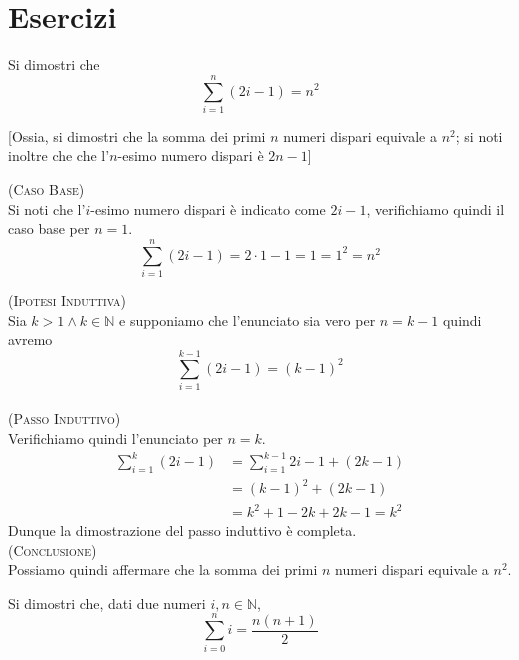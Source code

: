 \section{Esercizi}



\begin{esercizio}
Si dimostri che 
$$\sum\limits_{i=1}^{n} (2 i -1) = n^2$$

[Ossia, si dimostri che la somma dei primi $n$ numeri dispari equivale a $n^2$; si noti inoltre che che l'$n$-esimo numero dispari è $2n-1$]
\end{esercizio}

\begin{soluzione}
    

\textsc{(Caso Base)}\\
Si noti che l'$i$-esimo numero dispari è indicato come $2 i - 1$, verifichiamo quindi il caso base per $n=1$.
$$\sum\limits_{i=1}^{n} (2 i -1) = 2\cdot 1 - 1 = 1 = 1^2 = n^2$$


\textsc{(Ipotesi Induttiva)}\\
Sia $k>1 \wedge k\in\mathbb{N}$ e supponiamo che l'enunciato sia vero per $n=k-1$ quindi avremo 
$$\sum\limits_{i=1}^{k-1} (2 i -1)=(k-1)^2 $$\\

\textsc{(Passo Induttivo)}\\
Verifichiamo quindi l'enunciato per $n=k$. 
\begin{align*}
\sum\limits_{i=1}^{k} (2i -1) &= \sum\limits_{i=1}^{k-1} 2i - 1 +(2k-1)\\
&= (k-1)^2+(2k-1)\\
&= k^2+1-2k+2k-1 = k^2
\end{align*}
Dunque la dimostrazione del passo induttivo è completa.\\

\textsc{(Conclusione)}\\
Possiamo quindi affermare che la somma dei primi $n$ numeri dispari equivale a $n^2$. \\
\end{soluzione}


\begin{esercizio}
Si dimostri che, dati due numeri $i,n\in\mathbb{N}$, $$\sum\limits_{i=0}^{n} i = \dfrac{n(n+1)}{2}$$
\end{esercizio}

